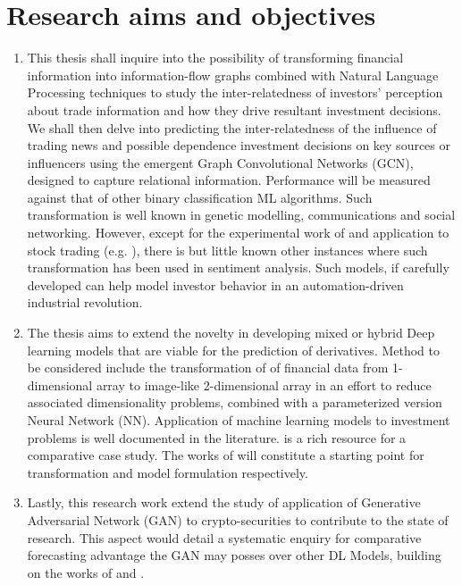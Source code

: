 \documentclass[a4paper,11pt]{scrartcl}
\begin{document}
\section{Research aims and objectives}
\begin{enumerate}
    \item This thesis shall inquire into the possibility of transforming financial information into information-flow graphs combined with Natural Language Processing techniques to study the inter-relatedness of investors' perception about trade information and how they drive resultant investment decisions. We shall then delve into predicting the inter-relatedness of the influence of trading news and possible dependence investment decisions on key sources or influencers using the emergent  Graph Convolutional Networks (GCN), designed to capture relational information. Performance will be  measured against that of other binary classification ML algorithms.
          Such transformation is well known in genetic modelling, communications and social networking. However, except for the experimental work of  \cite{weber2019anti} and application to stock trading (e.g. \cite{chen2018incorporating,wang2019alphastock}), there is but little known other instances where such transformation has been used in sentiment analysis. Such models, if carefully developed can help model investor behavior in an automation-driven industrial revolution. \label{obj_1}
    \item The thesis aims to extend the novelty in developing mixed or hybrid Deep learning models that are viable for the prediction of derivatives. Method to be considered include the transformation of of financial data from 1-dimensional array to image-like 2-dimensional array in an effort to reduce associated dimensionality problems, combined with a parameterized version Neural Network (NN). Application of machine learning models to investment problems is well documented in the literature. \cite{ozbayoglu2020deep} is a rich resource for a comparative case study. The works of \cite{culkin2017machine, sezer2020financial} will constitute a starting point for transformation and model formulation respectively. \label{obj_2}
    \item Lastly, this research work extend the study of application of Generative Adversarial Network (GAN) to crypto-securities to contribute to the state of research. This aspect would detail a systematic enquiry for comparative forecasting advantage the GAN may posses over other DL Models, building on the works of \cite{zola2020generative} and \cite{grilli2020generative}. \label{obj_3}
\end{enumerate}
\end{document}
